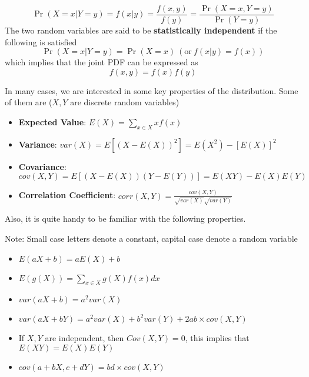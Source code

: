 \[
\Pr(X=x|Y=y)=f(x|y)=\frac{f(x,y)}{f(y)}=\frac{\Pr(X=x, Y=y)}{\Pr(Y=y)}
\] 
The two random variables are said to be \textbf{statistically independent} if the following is satisfied
\[
\Pr(X=x|Y=y)=\Pr(X=x)\ (\text{or}\ f(x|y)=f(x))
\]
which implies that the joint PDF can be expressed as
\[
f(x,y)=f(x)f(y)
\] \par\medskip
In many cases, we are interested in some key properties of the distribution. Some of them are ($X,Y$ are discrete random variables) \\
\begin{itemize}
\item \textbf{Expected Value}: $E(X)=\sum_{x\in X} xf(x)$
\item \textbf{Variance}: $var(X)=E[(X-E(X))^2]=E(X^2)-[E(X)]^2$
\item \textbf{Covariance}: $cov(X,Y)=E[(X-E(X))(Y-E(Y))]=E(XY)-E(X)E(Y)$
\item \textbf{Correlation Coefficient}: $corr(X,Y)=\frac{cov(X,Y)}{\sqrt{var(X)}\sqrt{var(Y)}}$
\end{itemize}  \par\medskip\medskip
Also, it is quite handy to be familiar with the following properties.\\
\begin{mdframed}[backgroundcolor=blue!5] 
\begin{property}
Note: Small case letters denote a constant, capital case denote a random variable
\begin{itemize}
\item $E(aX+b) = aE(X)+b$
\item $E(g(X))=\sum_{x\in X}g(X)f(x)dx$
\item $var(aX+b)=a^2var(X)$
\item $var(aX+bY)=a^2var(X)+b^2var(Y)+2ab\times cov(X,Y)$
\item If $X,Y$ are independent, then $Cov(X,Y) =0$, this implies that \\$E(XY)=E(X)E(Y)$
\item $cov(a+bX, c+dY)=bd\times cov(X,Y)$ 
\end{itemize} \par\medskip
\end{property}
\end{mdframed}

